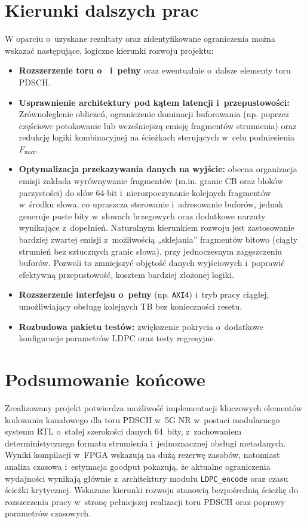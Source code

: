 \section*{Kierunki dalszych prac}
W oparciu o~uzyskane rezultaty oraz zidentyfikowane ograniczenia można wskazać następujące, logiczne kierunki rozwoju projektu:

\begin{itemize}
  \item \textbf{Rozszerzenie toru o~ i~pełny } oraz ewentualnie o~dalsze elementy toru PDSCH. 

  \item \textbf{Usprawnienie architektury pod kątem latencji i~przepustowości:} Zrównoleglenie obliczeń, ograniczenie dominacji buforowania (np. poprzez częściowe potokowanie lub wcześniejszą emisję fragmentów strumienia) oraz redukcję logiki kombinacyjnej na ścieżkach sterujących w~celu podniesienia $F_{\max}$. 

  \item \textbf{Optymalizacja przekazywania danych na wyjście:}
  obecna organizacja emisji zakłada wyrównywanie fragmentów (m.in. granic CB oraz bloków parzystości) do słów 64-bit
  i~nierozpoczynanie kolejnych fragmentów w~środku słowa, co upraszcza sterowanie i~adresowanie buforów,
  jednak generuje puste bity w~słowach brzegowych oraz dodatkowe narzuty wynikające z~dopełnień.
  Naturalnym kierunkiem rozwoju jest zastosowanie bardziej zwartej emisji z~możliwością „sklejania” fragmentów
  bitowo (ciągły strumień bez sztucznych granic słowa), przy jednoczesnym zagęszczeniu buforów.
  Pozwoli to zmniejszyć objętość danych wyjściowych i~poprawić efektywną przepustowość,
  kosztem bardziej złożonej logiki.



  \item \textbf{Rozszerzenie interfejsu o~pełny } (np. \texttt{AXI4}) i~tryb pracy ciągłej, umożliwiający obsługę kolejnych TB bez konieczności resetu. 

  \item \textbf{Rozbudowa pakietu testów:} zwiększenie pokrycia o~dodatkowe konfiguracje parametrów LDPC oraz testy regresyjne.
\end{itemize}

\section*{Podsumowanie końcowe}
Zrealizowany projekt potwierdza możliwość implementacji kluczowych elementów kodowania kanałowego dla toru PDSCH w~5G NR w~postaci modularnego systemu RTL o~stałej szerokości danych 64~bity, z~zachowaniem deterministycznego formatu strumienia i~jednoznacznej obsługi metadanych. Wyniki kompilacji w~FPGA wskazują na dużą rezerwę zasobów, natomiast analiza czasowa i~estymacja goodput pokazują, że aktualne ograniczenia wydajności wynikają głównie z~architektury modułu \texttt{LDPC\_encode} oraz czasu ścieżki krytycznej. Wskazane kierunki rozwoju stanowią bezpośrednią ścieżkę do rozszerzenia pracy w~stronę pełniejszej realizacji toru PDSCH oraz poprawy parametrów czasowych. 
